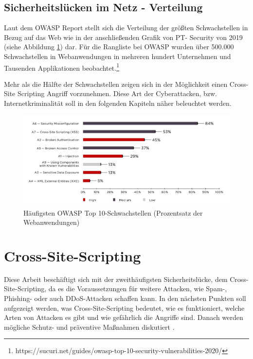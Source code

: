 \subsection{Sicherheitslücken im Netz - Verteilung}
\label{section:securityrisks_in_the_web}

Laut dem OWASP Report stellt sich die Verteilung der größten Schwachstellen in Bezug auf das Web wie in der anschließenden Grafik von PT- Security von 2019 (siehe Abbildung \ref{figure:most-common-owasp-top10}) dar. Für die Rangliste bei OWASP wurden über 500.000 Schwachstellen in Webanwendungen in mehreren hundert Unternehmen und Tausenden Applikationen beobachtet.\footnote{https://sucuri.net/guides/owasp-top-10-security-vulnerabilities-2020/}

Mehr als die Hälfte der Schwachstellen zeigen sich in der Möglichkeit einen Cross- Site Scripting Angriff vorzunehmen. Diese Art der Cyberattacken, bzw. Internetkriminalität soll in den folgenden Kapiteln näher beleuchtet werden.

\begin{figure}[ht]
	\centering
	\includegraphics[width=1\linewidth]{images/most-common-owasp-top10-vulnerabilities.jpg}
	\caption[Häufigsten OWASP Top 10-Schwachstellen]
	{Häufigsten OWASP Top 10-Schwachstellen (Prozentsatz der Webanwendungen) \autocite{ptsecurity2019}}
	\label{figure:most-common-owasp-top10}
\end{figure}

\section{Cross-Site-Scripting}
\label{section:cross-site-scripting}

Diese Arbeit beschäftigt sich mit der zweithäufigsten Sicherheitslücke, dem Cross-Site-Scripting, da es die Voraussetzungen für weitere Attacken, wie Spam-, Phishing- oder auch DDoS-Attacken schaffen kann. In den nächsten Punkten soll aufgezeigt werden, was Cross-Site-Scripting bedeutet, wie es funktioniert, welche Arten von Attacken es gibt und wie gefährlich die Angriffe sind. Danach werden mögliche Schutz- und präventive Maßnahmen diskutiert \autocite{ptsecurity2019}.

